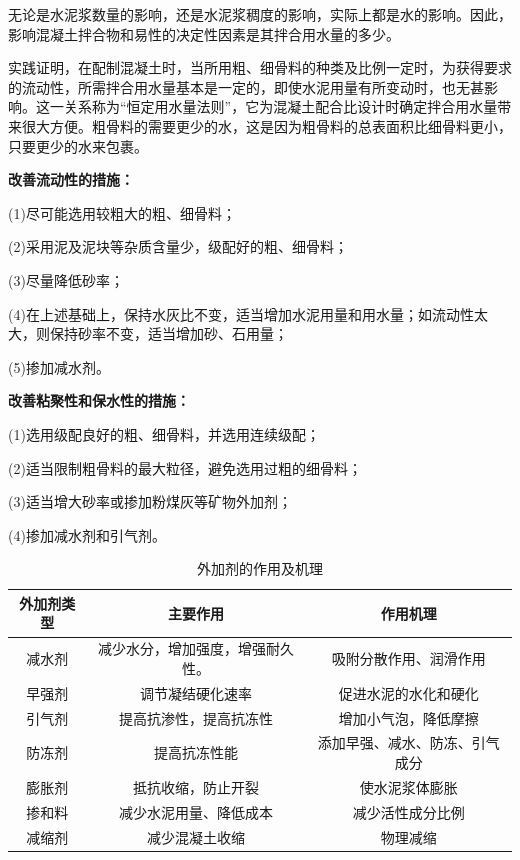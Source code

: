 \documentclass[12pt, a4paper, oneside, UTF8]{ctexbook}
\begin{document}
\begin{theorem}
无论是水泥浆数量的影响，还是水泥浆稠度的影响，实际上都是水的影响。因此，影响混凝土拌合物和易性的决定性因素是其拌合用水量的多少。

实践证明，在配制混凝土时，当所用粗、细骨料的种类及比例一定时，为获得要求的流动性，所需拌合用水量基本是一定的，即使水泥用量有所变动时，也无甚影响。这一关系称为“恒定用水量法则”，它为混凝土配合比设计时确定拌合用水量带来很大方便。{\color{red}粗骨料的需要更少的水，这是因为粗骨料的总表面积比细骨料更小，只要更少的水来包裹}。
\end{theorem}

\textbf{改善流动性的措施：}

(1)尽可能选用较粗大的粗、细骨料；

(2)采用泥及泥块等杂质含量少，级配好的粗、细骨料；

(3)尽量降低砂率；

(4)在上述基础上，保持水灰比不变，适当增加水泥用量和用水量；如流动性太大，则保持砂率不变，适当增加砂、石用量；

(5)掺加减水剂。

\textbf{改善粘聚性和保水性的措施：}

(1)选用级配良好的粗、细骨料，并选用连续级配；

(2)适当限制粗骨料的最大粒径，避免选用过粗的细骨料；

(3)适当增大砂率或掺加粉煤灰等矿物外加剂；

(4)掺加减水剂和引气剂。

\begin{table}[H]
    \centering
    \begin{tabular}{|c|c|c|}
    \hline
    \textbf{外加剂类型} & \textbf{主要作用} & \textbf{作用机理} \\
    \hline
    减水剂 & 减少水分，增加强度，增强耐久性。 & 吸附分散作用、润滑作用\\
    \hline
    早强剂 & 调节凝结硬化速率 & 促进水泥的水化和硬化\\
    \hline
    引气剂 & 提高抗渗性，提高抗冻性 & 增加小气泡，降低摩擦\\
    \hline
    防冻剂 & 提高抗冻性能 & 添加早强、减水、防冻、引气成分\\
    \hline
    膨胀剂 & 抵抗收缩，防止开裂 & 使水泥浆体膨胀\\
    \hline
    掺和料 & 减少水泥用量、降低成本 & 减少活性成分比例\\
    \hline
    减缩剂 & 减少混凝土收缩 & 物理减缩\\
    \hline
    \end{tabular}
    \caption{外加剂的作用及机理}
\end{table}
\end{document}
